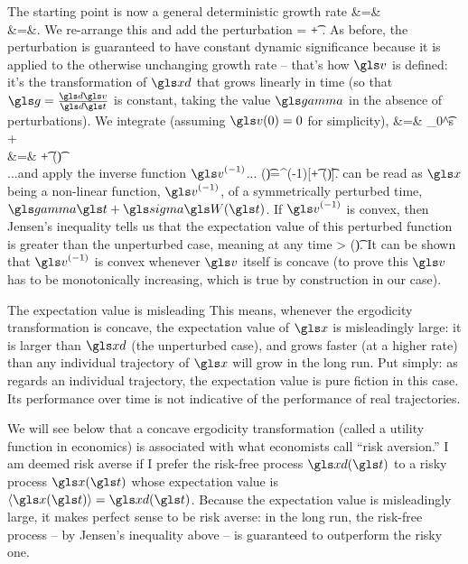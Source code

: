 The starting point is now a general deterministic growth rate
\bea
\g&=&\frac{\gd\gv(\xd)}{\gd\t}\\
&=&\ggamma.
\eea
We re-arrange this and add the perturbation
\be
\gd \gv= \ggamma \gd\t + \gsigma \gd\gW.
\ee
As before, the perturbation is guaranteed to have constant dynamic significance because it is applied to 
the otherwise unchanging growth rate -- that's how $\gv$ is defined: it's the transformation of $\xd$ that 
grows linearly in time (so that $\g=\frac{\gd\gv}{\gd\t}$ is constant, taking the value $\ggamma$ in 
the absence of perturbations). We integrate (assuming $\gv(0)=0$ for simplicity),
\bea
\gv[\x(\t)]&=& \int_0^\t \ggamma \gd s + \gsigma \gd\gW\\
&=& \ggamma \t  + \gsigma \gW(\t)\\
\eea
...and apply the inverse function $\gv^{(-1)}$...
\be
\x(\t)=\gv^{(-1)}[\ggamma \t  + \gsigma \gW(\t)].
\ee
{} can be read as $\x$ being a non-linear function, $\gv^{(-1)}$, of a symmetrically perturbed 
time, $\ggamma \t + \gsigma \gW(\t)$. If $\gv^{(-1)}$ is convex, then Jensen's inequality tells us that the 
expectation value of this perturbed function is greater than the unperturbed case, meaning at any time
\be
\ave{\x(\t)} > \xd(\t).
\ee
It can be shown that $\gv^{(-1)}$ is convex whenever $\gv$ itself is concave (to prove this $\gv$ has 
to be monotonically increasing, which is true by construction in our case).

\begin{keypts}{The expectation value is misleading}
This means, whenever the ergodicity transformation is concave, the expectation value of $\x$ is 
misleadingly large: it is larger than $\xd$ (the unperturbed case), and grows faster (at a higher rate) 
than any individual trajectory of $\x$ will grow in the long run. 
Put simply: as regards an individual trajectory, 
the expectation value is pure fiction in this case. Its performance over time is not indicative of
the performance of real trajectories.
\end{keypts}

We will see below that a concave ergodicity transformation (called a utility function in economics) is 
associated with what economists call ``risk aversion.'' I am deemed risk averse if I prefer the risk-free 
process $\xd(\t)$ to a risky process $\x(\t)$ whose expectation value is $\ave{\x(\t)}=\xd(\t)$. 
Because the expectation value is misleadingly large, it makes perfect sense to be risk averse: 
in the long run, the risk-free process -- by Jensen's inequality above -- is guaranteed to outperform 
the risky one.

